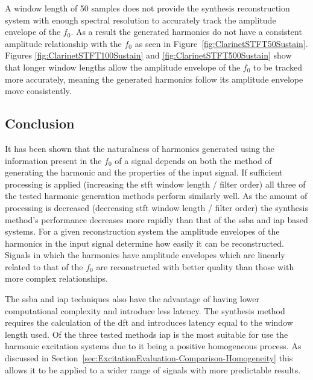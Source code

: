 		A window length of 50 samples does not provide the synthesis reconstruction system with enough spectral
		resolution to accurately track the amplitude envelope of the $f_{0}$. As a result the generated harmonics
		do not have a consistent amplitude relationship with the $f_{0}$ as seen in
		Figure~\ref{fig:ClarinetSTFT50Sustain}. Figures \ref{fig:ClarinetSTFT100Sustain} and
		\ref{fig:ClarinetSTFT500Sustain} show that longer window lengths allow the amplitude envelope of the
		$f_{0}$ to be tracked more accurately, meaning the generated harmonics follow its amplitude envelope move
		consistently.
		
	\subsection{Conclusion}
	\label{sec:PerceptualExperiments-Reconstruction-Conclusion}
		It has been shown that the naturalness of harmonics generated using the information present in the $f_{0}$
		of a signal depends on both the method of generating the harmonic and the properties of the input signal.
		If sufficient processing is applied (increasing the \acrshort{stft} window length / filter order) all three
		of the tested harmonic generation methods perform similarly well. As the amount of processing is decreased
		(decreasing \acrshort{stft} window length / filter order) the synthesis method's performance decreases more
		rapidly than that of the \acrshort{ssba} and \acrshort{iap} based systems. For a given reconstruction
		system the amplitude envelopes of the harmonics in the input signal determine how easily it can be
		reconstructed.  Signals in which the harmonics have amplitude envelopes which are linearly related to that
		of the $f_{0}$ are reconstructed with better quality than those with more complex relationships.
		
		The \acrshort{ssba} and \acrshort{iap} techniques also have the advantage of having lower computational
		complexity and introduce less latency. The synthesis method requires the calculation of the \acrshort{dft}
		and introduces latency equal to the window length used. Of the three tested methods \acrshort{iap} is the
		most suitable for use the harmonic excitation systems due to it being a positive homogeneous process. As
		discussed in Section~\ref{sec:ExcitationEvaluation-Comparison-Homogeneity} this allows it to be applied to
		a wider range of signals with more predictable results.


